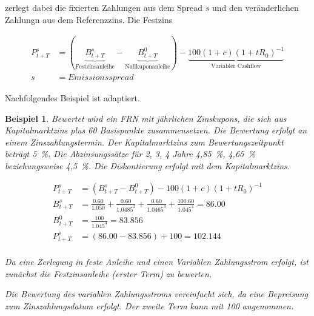 \documentclass[12pt, a4paper]{article}
\theoremstyle{plain}
\newtheorem{example}{Beispiel}
\begin{document}
\textcite[][]{alexander_market_2008} zerlegt dabei die fixierten Zahlungen aus dem Spread $s$ und den veränderlichen Zahlungn aus dem Referenzzins. Die Festzins

\begin{align*}
	P_{t+T}^{s}&=(\underbrace{B_{t+T}^{s}}_\text{Festzinsanleihe}-\underbrace{B_{t+T}^{0}}_\text{Nullkuponanleihe})-\underbrace{100(1+c)(1+t R_{0})^{-1}}_\text{Variabler Cashflow}\\
	s&= Emissionsspread
\end{align*}


Nachfolgendes Beispiel ist \textcite[][32]{alexander_market_2008} adaptiert.

\begin{example}
	Bewertet wird ein \gls{FRN} mit jährlichen Zinskupons, die sich aus Kapitalmarktzins plus 60 Basispunkte zusammensetzen. Die Bewertung erfolgt an einem Zinszahlungstermin. Der Kapitalmarktzins zum Bewertungszeitpunkt beträgt 5~\%. Die Abzinsungssätze für 2, 3, 4 Jahre 4,85~\%, 4,65~\% beziehungsweise 4,5~\%.
	Die Diskontierung erfolgt mit dem Kapitalmarktzins.

	\begin{align*}
		P_{t+T}^{s}&=\left(B_{t+T}^{s}-B_{t+T}^{0}\right)-100(1+c)\left(1+t R_{0}\right)^{-1}\\
		B_{t+T}^{s}&=\frac{0.60}{1.050}+\frac{0.60}{1.0485^2}+\frac{0.60}{1.0465^3}+\frac{100.60}{1.045^4}=86.00\\
		B_{t+T}^{0}&=\frac{100}{1.045^4}=83.856\\
		P_{t+T}^{s}&= (86.00-83.856) + 100 = 102.144\\
	\end{align*}

	Da eine Zerlegung in feste Anleihe und einen Variablen Zahlungsstrom erfolgt, ist zunächst die Festzinsanleihe (erster Term) zu bewerten.

	Die Bewertung des variablen Zahlungsstroms vereinfacht sich, da eine Bepreisung zum Zinszahlungsdatum erfolgt. Der zweite Term kann mit 100 angenommen.
\end{example}


\end{document}
